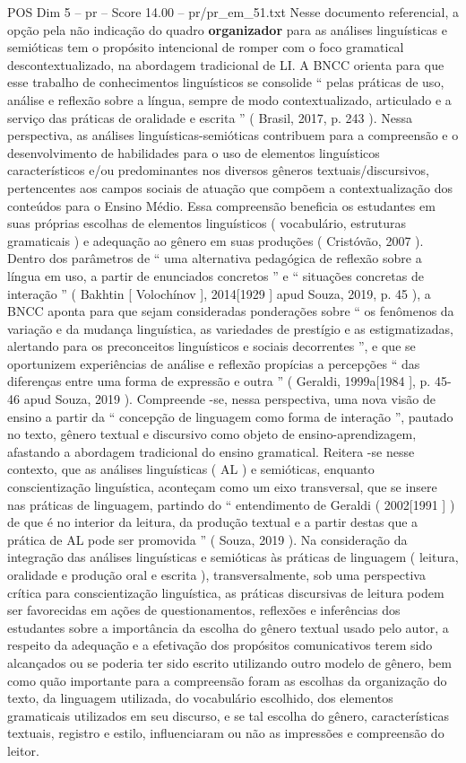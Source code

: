 \begin{textsample}{POS Dim 5 – pr – Score 14.00 – pr/pr\_em\_51.txt}
Nesse documento referencial, a opção pela não indicação do quadro \textbf{organizador} para as análises linguísticas e semióticas tem o propósito intencional de romper com o foco gramatical descontextualizado, na abordagem tradicional de LI.
A BNCC orienta para que esse trabalho de conhecimentos linguísticos se consolide “ pelas práticas de uso, análise e reflexão sobre a língua, sempre de modo contextualizado, articulado e a serviço das práticas de oralidade e escrita ” ( Brasil, 2017, p. 243 ).
Nessa perspectiva, as análises linguísticas-semióticas contribuem para a compreensão e o desenvolvimento de habilidades para o uso de elementos linguísticos característicos e/ou predominantes nos diversos gêneros textuais/discursivos, pertencentes aos campos sociais de atuação que compõem a contextualização dos conteúdos para o Ensino Médio.
Essa compreensão beneficia os estudantes em suas próprias escolhas de elementos linguísticos ( vocabulário, estruturas gramaticais ) e adequação ao gênero em suas produções ( Cristóvão, 2007 ).
Dentro dos parâmetros de “ uma alternativa pedagógica de reflexão sobre a língua em uso, a partir de enunciados concretos ” e “ situações concretas de interação ” ( Bakhtin [ Volochínov ], 2014[1929 ] apud Souza, 2019, p. 45 ), a BNCC aponta para que sejam consideradas ponderações sobre “ os fenômenos da variação e da mudança linguística, as variedades de prestígio e as estigmatizadas, alertando para os preconceitos linguísticos e sociais decorrentes ”, e que se oportunizem experiências de análise e reflexão propícias a percepções “ das diferenças entre uma forma de expressão e outra ” ( Geraldi, 1999a[1984 ], p. 45-46 apud Souza, 2019 ).
Compreende -se, nessa perspectiva, uma nova visão de ensino a partir da “ concepção de linguagem como forma de interação ”, pautado no texto, gênero textual e discursivo como objeto de ensino-aprendizagem, afastando a abordagem tradicional do ensino gramatical.
Reitera -se nesse contexto, que as análises linguísticas ( AL ) e semióticas, enquanto conscientização linguística, aconteçam como um eixo transversal, que se insere nas práticas de linguagem, partindo do “ entendimento de Geraldi ( 2002[1991 ] ) de que é no interior da leitura, da produção textual e a partir destas que a prática de AL pode ser promovida ” ( Souza, 2019 ).
Na consideração da integração das análises linguísticas e semióticas às práticas de linguagem ( leitura, oralidade e produção oral e escrita ), transversalmente, sob uma perspectiva crítica para conscientização linguística, as práticas discursivas de leitura podem ser favorecidas em ações de questionamentos, reflexões e inferências dos estudantes sobre a importância da escolha do gênero textual usado pelo autor, a respeito da adequação e a efetivação dos propósitos comunicativos terem sido alcançados ou se poderia ter sido escrito utilizando outro modelo de gênero, bem como quão importante para a compreensão foram as escolhas da organização do texto, da linguagem utilizada, do vocabulário escolhido, dos elementos gramaticais utilizados em seu discurso, e se tal escolha do gênero, características textuais, registro e estilo, influenciaram ou não as impressões e compreensão do leitor.

\end{textsample}
